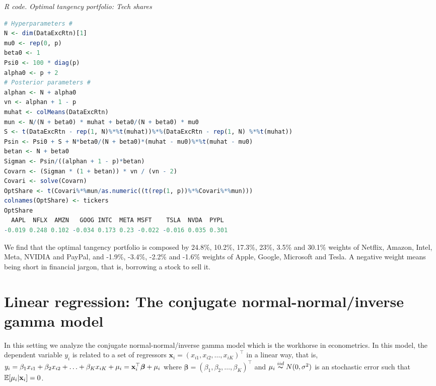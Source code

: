 \begin{enumerate}
\begin{tcolorbox}[enhanced,width=4.67in,center upper,
	fontupper=\large\bfseries,drop shadow southwest,sharp corners]
	\textit{R code. Optimal tangency portfolio: Tech shares}
\begin{VF}
\begin{lstlisting}[language=R]
# Hyperparameters #
N <- dim(DataExcRtn)[1]
mu0 <- rep(0, p)
beta0 <- 1
Psi0 <- 100 * diag(p)
alpha0 <- p + 2
# Posterior parameters #
alphan <- N + alpha0
vn <- alphan + 1 - p
muhat <- colMeans(DataExcRtn)
mun <- N/(N + beta0) * muhat + beta0/(N + beta0) * mu0
S <- t(DataExcRtn - rep(1, N)%*%t(muhat))%*%(DataExcRtn - rep(1, N) %*%t(muhat)) 
Psin <- Psi0 + S + N*beta0/(N + beta0)*(muhat - mu0)%*%t(muhat - mu0)
betan <- N + beta0
Sigman <- Psin/((alphan + 1 - p)*betan)
Covarn <- (Sigman * (1 + betan)) * vn / (vn - 2)
Covari <- solve(Covarn)
OptShare <- t(Covari%*%mun/as.numeric((t(rep(1, p))%*%Covari%*%mun)))
colnames(OptShare) <- tickers
OptShare
  AAPL  NFLX  AMZN   GOOG INTC  META MSFT    TSLA  NVDA  PYPL
-0.019 0.248 0.102 -0.034 0.173 0.23 -0.022 -0.016 0.035 0.301
\end{lstlisting}
\end{VF}
\end{tcolorbox}

We find that the optimal tangency portfolio is composed by 24.8\%, 10.2\%, 17.3\%, 23\%, 3.5\% and 30.1\% weights of Netflix, Amazon, Intel, Meta, NVIDIA and PayPal, and -1.9\%, -3.4\%, -2.2\% and -1.6\% weights of Apple, Google, Microsoft and Tesla. A negative weight means being short in financial jargon, that is, borrowing a stock to sell it.
\end{enumerate}


\section{Linear regression: The conjugate normal-normal/inverse gamma model}\label{sec43}

In this setting we analyze the conjugate normal-normal/inverse gamma model which is the workhorse in econometrics. In this model, the dependent variable $y_i$ is related to a set of regressors ${\mathbf{x}}_i=(x_{i1},x_{i2},\ldots,x_{iK})^{\top}$ in a linear way, that is, $y_i=\beta_1x_{i1}+\beta_2x_{i2}+\ldots+\beta_Kx_{iK}+\mu_i={\bf{x}}_i^{\top}\bm{\beta}+\mu_i$ where $\bm{\beta}=(\beta_1,\beta_2,\ldots,\beta_K)^{\top}$ and $\mu_i\stackrel{iid} {\thicksim}N(0,\sigma^2)$ is an stochastic error such that $\mathbb{E}[\mu_i|{\bf{x}}_i]=0$.

